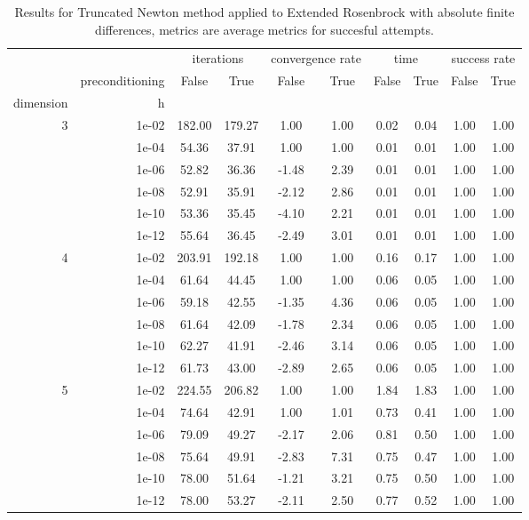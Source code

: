 \begin{table}
\centering
\caption{Results for Truncated Newton method applied to Extended Rosenbrock with absolute finite differences, metrics are average metrics for succesful attempts.}
\label{tab:Truncated_Newton_Extended_Rosenbrock_fd_abs}
\begin{tabular}{rr|cc|cc|cc|cc}
\toprule
    &  & \multicolumn{2}{|c}{iterations} & \multicolumn{2}{|c}{convergence rate} & \multicolumn{2}{|c}{time} & \multicolumn{2}{|c}{success rate} \\
    & preconditioning & False & True & False & True & False & True & False & True \\
dimension & h &  &  &  &  &  &  &  &  \\
\midrule
\multirow[t]{6}{*}{3} & 1e-02 & 182.00 & 179.27 & 1.00 & 1.00 & 0.02 & 0.04 & 1.00 & 1.00 \\
    & 1e-04 & 54.36 & 37.91 & 1.00 & 1.00 & 0.01 & 0.01 & 1.00 & 1.00 \\
    & 1e-06 & 52.82 & 36.36 & -1.48 & 2.39 & 0.01 & 0.01 & 1.00 & 1.00 \\
    & 1e-08 & 52.91 & 35.91 & -2.12 & 2.86 & 0.01 & 0.01 & 1.00 & 1.00 \\
    & 1e-10 & 53.36 & 35.45 & -4.10 & 2.21 & 0.01 & 0.01 & 1.00 & 1.00 \\
    & 1e-12 & 55.64 & 36.45 & -2.49 & 3.01 & 0.01 & 0.01 & 1.00 & 1.00 \\
\cline{1-10}
\multirow[t]{6}{*}{4} & 1e-02 & 203.91 & 192.18 & 1.00 & 1.00 & 0.16 & 0.17 & 1.00 & 1.00 \\
    & 1e-04 & 61.64 & 44.45 & 1.00 & 1.00 & 0.06 & 0.05 & 1.00 & 1.00 \\
    & 1e-06 & 59.18 & 42.55 & -1.35 & 4.36 & 0.06 & 0.05 & 1.00 & 1.00 \\
    & 1e-08 & 61.64 & 42.09 & -1.78 & 2.34 & 0.06 & 0.05 & 1.00 & 1.00 \\
    & 1e-10 & 62.27 & 41.91 & -2.46 & 3.14 & 0.06 & 0.05 & 1.00 & 1.00 \\
    & 1e-12 & 61.73 & 43.00 & -2.89 & 2.65 & 0.06 & 0.05 & 1.00 & 1.00 \\
\cline{1-10}
\multirow[t]{6}{*}{5} & 1e-02 & 224.55 & 206.82 & 1.00 & 1.00 & 1.84 & 1.83 & 1.00 & 1.00 \\
    & 1e-04 & 74.64 & 42.91 & 1.00 & 1.01 & 0.73 & 0.41 & 1.00 & 1.00 \\
    & 1e-06 & 79.09 & 49.27 & -2.17 & 2.06 & 0.81 & 0.50 & 1.00 & 1.00 \\
    & 1e-08 & 75.64 & 49.91 & -2.83 & 7.31 & 0.75 & 0.47 & 1.00 & 1.00 \\
    & 1e-10 & 78.00 & 51.64 & -1.21 & 3.21 & 0.75 & 0.50 & 1.00 & 1.00 \\
    & 1e-12 & 78.00 & 53.27 & -2.11 & 2.50 & 0.77 & 0.52 & 1.00 & 1.00 \\
\cline{1-10}
\bottomrule
\end{tabular}
\end{table}

